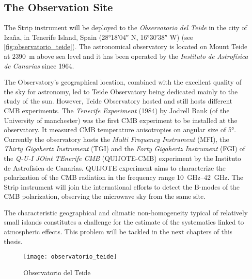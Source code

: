 \subsection{The Observation Site}

The Strip instrument will be deployed to the \emph{Observatorio del Teide}
in the city of Iza\~na, in Tenerife Island, Spain (\ang{28;18;04} N,
\ang{16;30;38} W) (see \autoref{fig:observatorio_teide}). The astronomical
observatory is located on Mount Teide at \SI{2390}{\meter} above sea level
and it has been operated by the \emph{Instituto de Astrof\'isica de
Canarias} since 1964.

The Observatory's geographical location, combined with the excellent
quality of the sky for astronomy, led to Teide Observatory being dedicated
mainly to  the study of the sun. However, Teide Observatory hosted and
still hosts different CMB experiments.
The \emph{Tenerife Experiment} (1984) by Jodrell Bank (of the University of
manchester) was the first CMB experiment to be installed at the
observatory. It measured CMB temperature anisotropies on angular size of
\ang{5}. Currently the observatory hosts the \emph{Multi Frequency
Instrument} (MFI), the \emph{Thirty Gigahertz Instrument} (TGI) and the
\emph{Forty Gigahertz Instrument} (FGI) of the \emph{Q-U-I JOint TEnerife
CMB} (QUIJOTE-CMB) experiment by the Instituto de Astrof\'isica de
Canarias. QUIJOTE experiment aims to characterize the
polarization of the CMB radiation in the frequency range
\SIrange{10}{42}{\giga\hertz}. The Strip instrument will join the
international efforts to detect the B-modes of the CMB polarization,
observing the microwave sky from the same site.

The characteristic geographical and climatic non-homogeneity typical of
relatively small islands constitutes a challenge for the estimate of the
systematics linked to atmospheric effects. This problem will be tackled in
the next chapters of this thesis.



\begin{figure}
        \centering
        \texttt{[image: observatorio\_teide]}
        \caption{Observatorio del Teide}
        \label{fig:observatorio_teide}
\end{figure}

